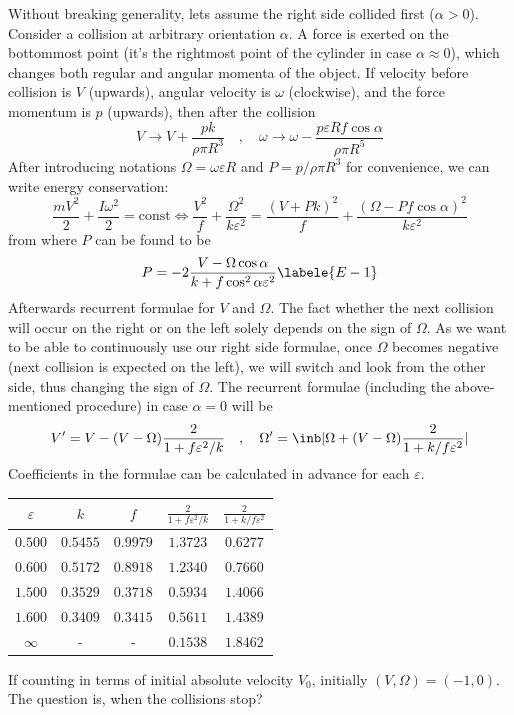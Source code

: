 Without breaking generality, lets assume the right side collided first ($\alpha>0$).
Consider a collision at arbitrary orientation $\alpha$.
A force is exerted on the bottommost point
(it's the rightmost point of the cylinder in case $\alpha \approx 0$),
which changes both regular and angular momenta of the object.
If velocity before collision is $V$ (upwards),
angular velocity is $\omega$ (clockwise),
and the force momentum is $p$ (upwards), then after the collision
\begin{equation}
    V \rightarrow V + \frac{p k} {\rho \pi R^3} \quad,\quad
    \omega \rightarrow \omega - \frac{p \varepsilon R f \cos\alpha} {\rho \pi R^5}
\end{equation}
After introducing notations $\Omega = \omega \varepsilon R$ and
$P=p/\rho\pi R^3$ for convenience, we can write energy conservation:
\begin{equation}
    \frac{mV^2}{2}+\frac{I\omega^2}{2}=\text{const} \Leftrightarrow
    \frac{V^2}{f}+\frac{\Omega^2}{k \varepsilon^2}  = 
    \frac{(V+Pk)^2}{f}+\frac{(\Omega-Pf\cos\alpha)^2}{k \varepsilon^2}
\end{equation}
from where $P$ can be found to be
\begin{equation}
    P=-2\frac{V-\Omega\cos\alpha}{k+f\cos^2\alpha\varepsilon^2}
    \labele{E-1}
\end{equation}
Afterwards recurrent formulae for $V$ and $\Omega$.
The fact whether the next collision will occur on the right or on the left 
solely depends on the sign of $\Omega$.
As we want to be able to continuously use our right side formulae,
once $\Omega$ becomes negative (next collision is expected on the left),
we will switch and look from the other side, thus changing the sign of $\Omega$.
The recurrent formulae (including the above-mentioned procedure) in case $\alpha=0$ will be
\begin{equation}
    V'=V-(V-\Omega)\frac{2}{1+f\varepsilon^2/k} \quad,\quad
    \Omega'=\inb|{\Omega+(V-\Omega)\frac{2}{1+k/f\varepsilon^2}}|
\end{equation}
Coefficients in the formulae can be calculated in advance for each $\varepsilon$.
\begin{center}
\begin{tabular}{c|c|c|c|c}
    $\varepsilon$ & $k$ & $f$ &
    \(\displaystyle \frac{2}{1+f\varepsilon^2/k} \) &
    \(\displaystyle \frac{2}{1+k/f\varepsilon^2} \) \\
    \hline
    $0.500$ & $0.5455$ & $0.9979$ & $1.3723$ & $0.6277$ \\
    $0.600$ & $0.5172$ & $0.8918$ & $1.2340$ & $0.7660$ \\
    $1.500$ & $0.3529$ & $0.3718$ & $0.5934$ & $1.4066$ \\
    $1.600$ & $0.3409$ & $0.3415$ & $0.5611$ & $1.4389$ \\
    $\infty$ & - & - & $0.1538$ & $1.8462$
\end{tabular}
\end{center}
If counting in terms of initial absolute velocity $V_0$, initially
$(V,\Omega)=(-1,0)$. The question is, when the collisions stop?

